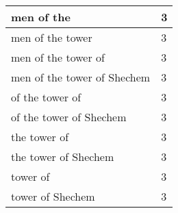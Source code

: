 \begin{center}
\begin{longtable}{|p{3.0in}|p{0.5in}|}
men of the & 3\\ \hline 
men of the tower & 3\\ \hline 
men of the tower of & 3\\ \hline 
men of the tower of Shechem & 3\\ \hline 
of the tower of & 3\\ \hline 
of the tower of Shechem & 3\\ \hline 
the tower of & 3\\ \hline 
the tower of Shechem & 3\\ \hline 
tower of & 3\\ \hline 
tower of Shechem & 3\\ \hline 
\end{longtable}
\end{center}





